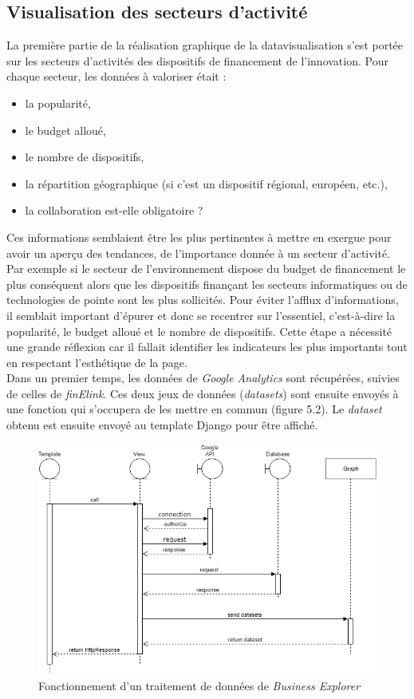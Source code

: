 \subsection{Visualisation des secteurs d'activité}
La première partie de la réalisation graphique de la datavisualisation s'est portée sur les secteurs d'activités des dispositifs de financement de l'innovation. Pour chaque secteur, les données à valoriser était : 
\begin{itemize}
\item la popularité,
\item le budget alloué,
\item le nombre de dispositifs,
\item la répartition géographique (si c'est un dispositif régional, européen, etc.),
\item la collaboration est-elle obligatoire ?
\end{itemize}
Ces informations semblaient être les plus pertinentes à mettre en exergue pour avoir un aperçu des tendances, de l'importance donnée à un secteur d'activité. Par exemple si le secteur de l'environnement dispose du budget de financement le plus conséquent alors que les dispositifs finançant les secteurs informatiques ou de technologies de pointe sont les plus sollicités. Pour éviter l'afflux d'informations, il semblait important d'épurer et donc se recentrer sur l'essentiel, c'est-à-dire la popularité, le budget alloué et le nombre de dispositifs. Cette étape a nécessité une grande réflexion car il fallait identifier les indicateurs les plus importants tout en respectant l'esthétique de la page.\\

Dans un premier temps, les données de \textit{Google Analytics} sont récupérées, suivies de celles de \textit{finElink}. Ces deux jeux de données (\textit{datasets}) sont ensuite envoyés à une fonction qui s'occupera de les mettre en commun (figure 5.2). Le \textit{dataset} obtenu est ensuite envoyé au template Django pour être affiché. 

\begin{figure}
\begin{center}
\includegraphics[scale=0.65]{resources/sequence_diagram_chart.png}
\caption{Fonctionnement d'un traitement de données de \textit{Business Explorer}}
\end{center}
\end{figure}


